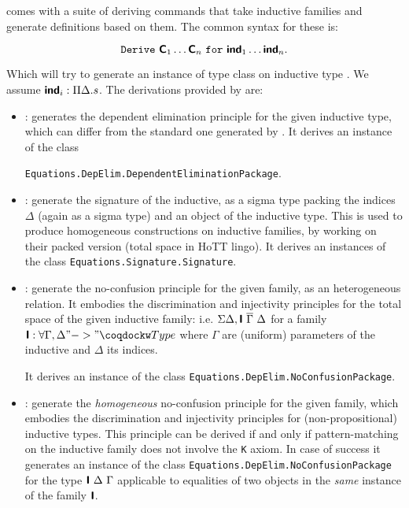 \Equations comes with a suite of deriving commands that take inductive
families and generate definitions based on them. The common syntax for
these is:

\[\mathtt{Derive}~\textbf{\mbox{\textsf{C}}}_1 \ldots \textbf{\mbox{\textsf{C}}}_n~\mathtt{for}~\textbf{\mbox{\textsf{ind}}}_1 \ldots \textbf{\mbox{\textsf{ind}}}_n.\]

Which will try to generate an instance of type class  on
inductive type . We assume $\textbf{\mbox{\textsf{ind}}}_i : \Pi \Delta. s$.
The derivations provided by \Equations are:

\begin{itemize}
\item {}: generates the dependent
  elimination principle for the given inductive type, which can differ
  from the standard one generated by \Coq.
  It derives an instance of the class

  \texttt{Equations.DepElim.DependentEliminationPackage}.
\item {}: generate the signature of the inductive, as a
  sigma type packing the indices $\Delta$ (again as a sigma type) and
  an object of the inductive type. This is used to produce homogeneous
  constructions on inductive families, by working on their packed
  version (total space in HoTT lingo).
  It derives an instances of the class
  \texttt{Equations.Signature.Signature}.

\item {}: generate the no-confusion principle for the
  given family, as an heterogeneous relation. It embodies the
  discrimination and injectivity principles for the
  total space of the given inductive family: i.e.
  $\Sigma \Delta, \textbf{\mbox{\textsf{I}}}~{\overline \Gamma}~\Delta$ for a family
  $\ind{I} : \forall \Gamma, \Delta "->" \kw{Type}$ where $\Gamma$ are
  (uniform) parameters of the inductive and $\Delta$ its indices.

  It derives an instance of the class \texttt{Equations.DepElim.NoConfusionPackage}.

\item {}: generate the \emph{homogeneous} no-confusion
  principle for the given family, which embodies the discrimination and
  injectivity principles for (non-propositional) inductive types.
  This principle can be derived if and only if pattern-matching on the
  inductive family does not involve the \texttt{K} axiom.
  In case of success it generates an instance of the class
  \texttt{Equations.DepElim.NoConfusionPackage} for the type $\textbf{\mbox{\textsf{I}}}~
  \Delta~\Gamma$ applicable to equalities of two objects in the \emph{same}
  instance of the family $\textbf{\mbox{\textsf{I}}}$.


\end{itemize}
